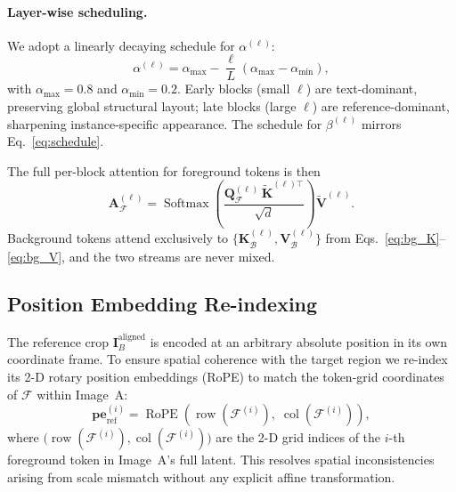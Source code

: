\paragraph{Layer-wise scheduling.}
We adopt a linearly decaying schedule for $\alpha^{(\ell)}$:
\begin{equation}
    \alpha^{(\ell)}
        = \alpha_{\max} - \frac{\ell}{L}
          \left(\alpha_{\max} - \alpha_{\min}\right),
    \label{eq:schedule}
\end{equation}
with $\alpha_{\max} = 0.8$ and $\alpha_{\min} = 0.2$.
Early blocks (small $\ell$) are text-dominant, preserving global structural layout; late
blocks (large $\ell$) are reference-dominant, sharpening instance-specific appearance.
The schedule for $\beta^{(\ell)}$ mirrors Eq.~\eqref{eq:schedule}.

The full per-block attention for foreground tokens is then
\begin{equation}
    \mathbf{A}_{\mathcal{F}}^{(\ell)}
        = \operatorname{Softmax}\!\!\left(
              \frac{\mathbf{Q}_{\mathcal{F}}^{(\ell)}\,
                    \tilde{\mathbf{K}}^{(\ell)\top}}{\sqrt{d}}
          \right)\tilde{\mathbf{V}}^{(\ell)}.
    \label{eq:fg_attn}
\end{equation}
Background tokens attend exclusively to
$\{\mathbf{K}_{\mathcal{B}}^{(\ell)}, \mathbf{V}_{\mathcal{B}}^{(\ell)}\}$
from Eqs.~\eqref{eq:bg_K}--\eqref{eq:bg_V}, and the two streams are never mixed.

\subsection{Position Embedding Re-indexing}

The reference crop $\mathbf{I}_B^{\text{aligned}}$ is encoded at an arbitrary absolute
position in its own coordinate frame.
To ensure spatial coherence with the target region we re-index its 2-D rotary position
embeddings (RoPE) to match the token-grid coordinates of $\mathcal{F}$ within Image~A:
\begin{equation}
    \mathbf{pe}_{\text{ref}}^{(i)}
        = \operatorname{RoPE}\!\left(
              \operatorname{row}\!\left(\mathcal{F}^{(i)}\right),\;
              \operatorname{col}\!\left(\mathcal{F}^{(i)}\right)
          \right),
    \label{eq:rope}
\end{equation}
where $\bigl(\operatorname{row}(\mathcal{F}^{(i)}), \operatorname{col}(\mathcal{F}^{(i)})\bigr)$
are the 2-D grid indices of the $i$-th foreground token in Image~A's full latent.
This resolves spatial inconsistencies arising from scale mismatch without any explicit affine
transformation.

